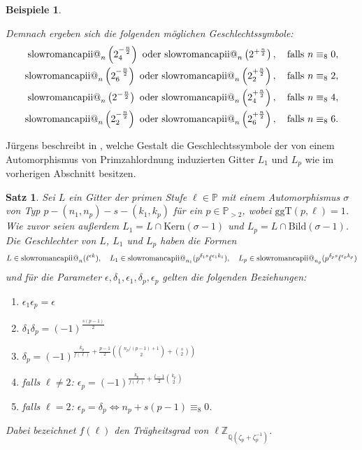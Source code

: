 \documentclass[12pt,a4paper,halfparskip,headsepline,bibtotocnumbered]{scrreprt}
\makeatletter
\theoremstyle{nummermitklammern}
\newtheorem{satz}[defsatzusw]{Satz}
\newtheorem{beispiele}[defsatzusw]{Beispiele}
\theoremstyle{nonumberbreak}
\newcommand{\Z}{\mathbb{Z}}
\newcommand{\Q}{\mathbb{Q}}
\renewcommand{\P}{\mathbb{P}}
\newcommand{\ii}{\text{\expandafter\@slowromancap\romannumeral 2@}}
\newcommand{\Kern}{\text{Kern}}
\newcommand{\Bild}{\text{Bild}}
\newcommand{\ggT}{\text{ggT}}
\makeatother
\begin{document}
\begin{beispiele}
\begin{enumerate}[label=(\roman*)]
			Demnach ergeben sich die folgenden möglichen Geschlechtssymbole:
			\begin{align*}
				\ii_n \left( 2_4^{-\frac{n}{2}} \right) \text{ oder } \ii_n \left( 2^{+\frac{n}{2}} \right), \quad \text{falls } n \equiv_8 0,\\
				\ii_n \left( 2_6^{-\frac{n}{2}} \right) \text{ oder } \ii_n \left( 2_2^{+\frac{n}{2}} \right), \quad \text{falls } n \equiv_8 2,\\
				\ii_n \left( 2^{-\frac{n}{2}} \right) \text{ oder } \ii_n \left( 2_4^{+\frac{n}{2}} \right), \quad \text{falls } n \equiv_8 4,\\
				\ii_n \left( 2_2^{-\frac{n}{2}} \right) \text{ oder } \ii_n \left( 2_6^{+\frac{n}{2}} \right), \quad \text{falls } n \equiv_8 6.
			\end{align*}
	\end{enumerate}
\end{beispiele}

Jürgens beschreibt in \cite[Abschnitt (4.1.3)]{juergens}, welche Gestalt die Geschlechtssymbole der von einem Automorphismus von Primzahlordnung induzierten Gitter $L_1$ und $L_p$ wie im vorherigen Abschnitt besitzen.

\begin{framed}
	\begin{satz}
		Sei $L$ ein Gitter der primen Stufe $\ell \in \P$ mit einem Automorphismus $\sigma$ von Typ $p - (n_1, n_p) - s - (k_1, k_p)$ für ein $p \in \P_{> 2}$, wobei $\ggT(p, \ell) = 1$. Wie zuvor seien außerdem $L_1 = L \cap \Kern(\sigma-1)$ und $L_p = L \cap \Bild(\sigma-1)$. Die Geschlechter von $L$, $L_1$ und $L_p$ haben die Formen
		\begin{equation*}
			L \in \ii_n(\ell^{\epsilon k}), \quad L_1 \in \ii_{n_1}(p^{\delta_1 s} \ell^{\epsilon_1 k_1}), \quad L_p \in \ii_{n_p}(p^{\delta_p s} \ell^{\epsilon_p k_p})
		\end{equation*}	
		und für die Parameter $\epsilon, \delta_1, \epsilon_1, \delta_p, \epsilon_p$ gelten die folgenden Beziehungen:
		\begin{enumerate}[label=(\roman*)]
			\item $\epsilon_1 \epsilon_p = \epsilon$
			\item $\delta_1 \delta_p = (-1)^{\frac{s(p-1)}{2}}$
			\item $\delta_p = (-1)^{\frac{k_p}{f(\ell)} + \frac{p-1}{2}\left({n_p / (p-1) +1 \choose 2} + {s \choose 2}\right)}$
			\item falls $\ell \neq 2$: $\epsilon_p = (-1)^{\frac{k_p}{f(\ell)} + \frac{l-1}{2} {k_p \choose 2}}$
			\item falls $\ell = 2$: $\epsilon_p = \delta_p \Leftrightarrow n_p + s(p-1) \equiv_8 0$.
		\end{enumerate}
		Dabei bezeichnet $f(\ell)$ den Trägheitsgrad von $\ell \Z_{\Q(\zeta_p + \zeta_p^{-1})}$.
	\end{satz}
\end{framed}
\end{document}

